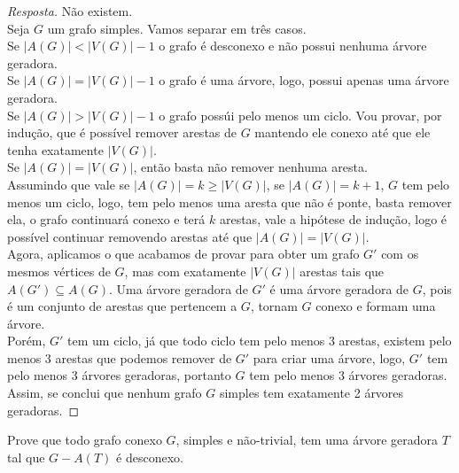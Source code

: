 \documentclass[12pt]{article}
\newenvironment{problem}[2][Ex]{\begin{trivlist}
\item[\hskip \labelsep {\bfseries #1}\hskip \labelsep {\bfseries #2.}]}{\end{trivlist}}
\begin{document}
\begin{proof}[Resposta]
Não existem. \\
Seja $G$ um grafo simples. Vamos separar em três casos. \\
Se $|A(G)| < |V(G)| - 1$ o grafo é desconexo e não possui nenhuma árvore geradora. \\
Se $|A(G)| = |V(G)| - 1$ o grafo é uma árvore, logo, possui apenas uma árvore geradora. \\
Se $|A(G)| > |V(G)| - 1$ o grafo possúi pelo menos um ciclo. Vou provar, por indução, que é possível remover arestas de $G$ mantendo ele conexo até que ele tenha exatamente $|V(G)|$. \\
Se $|A(G)| = |V(G)|$, então basta não remover nenhuma aresta. \\
Assumindo que vale se $|A(G)| = k \geq |V(G)|$, se $|A(G)| = k + 1$, $G$ tem pelo menos um ciclo, logo, tem pelo menos uma aresta que não é ponte, basta remover ela, o grafo continuará conexo e terá $k$ arestas, vale a hipótese de indução, logo é possível continuar removendo arestas até que $|A(G)| = |V(G)|$. \\
Agora, aplicamos o que acabamos de provar para obter um grafo $G'$ com os mesmos vértices de $G$, mas com exatamente $|V(G)|$ arestas tais que $A(G') \subseteq A(G)$. Uma árvore geradora de $G'$ é uma árvore geradora de $G$, pois é um conjunto de arestas que pertencem a $G$, tornam $G$ conexo e formam uma árvore. \\
Porém, $G'$ tem um ciclo, já que todo ciclo tem pelo menos 3 arestas, existem pelo menos 3 arestas que podemos remover de $G'$ para criar uma árvore, logo, $G'$ tem pelo menos 3 árvores geradoras, portanto $G$ tem pelo menos 3 árvores geradoras. \\
Assim, se conclui que nenhum grafo $G$ simples tem exatamente 2 árvores geradoras.
\end{proof}

\begin{problem}{14}
Prove que todo grafo conexo $G$, simples e não-trivial, tem uma árvore geradora $T$ tal que $G - A(T)$ é desconexo.
\end{problem}
\end{document}
